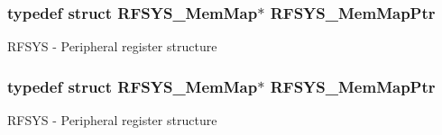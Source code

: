 \subsubsection[{\texorpdfstring{R\+F\+S\+Y\+S\+\_\+\+Mem\+Map\+Ptr}{RFSYS_MemMapPtr}}]{\setlength{\rightskip}{0pt plus 5cm}typedef struct {\bf R\+F\+S\+Y\+S\+\_\+\+Mem\+Map}$\ast$ {\bf R\+F\+S\+Y\+S\+\_\+\+Mem\+Map\+Ptr}}\hypertarget{group___r_f_s_y_s___peripheral_gaea9e2f6aeeb4976615e3c3dd87acff9e}{}\label{group___r_f_s_y_s___peripheral_gaea9e2f6aeeb4976615e3c3dd87acff9e}
R\+F\+S\+YS -\/ Peripheral register structure 
\subsubsection[{\texorpdfstring{R\+F\+S\+Y\+S\+\_\+\+Mem\+Map\+Ptr}{RFSYS_MemMapPtr}}]{\setlength{\rightskip}{0pt plus 5cm}typedef struct {\bf R\+F\+S\+Y\+S\+\_\+\+Mem\+Map}$\ast$ {\bf R\+F\+S\+Y\+S\+\_\+\+Mem\+Map\+Ptr}}\hypertarget{group___r_f_s_y_s___peripheral_gaea9e2f6aeeb4976615e3c3dd87acff9e}{}\label{group___r_f_s_y_s___peripheral_gaea9e2f6aeeb4976615e3c3dd87acff9e}
R\+F\+S\+YS -\/ Peripheral register structure 